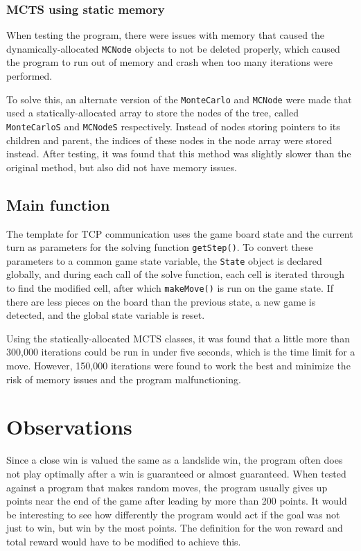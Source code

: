 \documentclass[12pt, a4paper]{article}
\begin{document}
    \subsubsection{MCTS using static memory}

    When testing the program, there were issues with memory that caused the dynamically-allocated {\tt MCNode} objects to not be deleted properly, which caused the program to run out of memory and crash when too many iterations were performed. 

    To solve this, an alternate version of the {\tt MonteCarlo} and {\tt MCNode} were made that used a statically-allocated array to store the nodes of the tree, called {\tt MonteCarloS} and {\tt MCNodeS} respectively. Instead of nodes storing pointers to its children and parent, the indices of these nodes in the node array were stored instead. After testing, it was found that this method was slightly slower than the original method, but also did not have memory issues.

    \subsection{Main function}

    The template for TCP communication uses the game board state and the current turn as parameters for the solving function {\tt getStep()}. To convert these parameters to a common game state variable, the {\tt State} object is declared globally, and during each call of the solve function, each cell is iterated through to find the modified cell, after which {\tt makeMove()} is run on the game state. If there are less pieces on the board than the previous state, a new game is detected, and the global state variable is reset. 

    Using the statically-allocated MCTS classes, it was found that a little more than 300,000 iterations could be run in under five seconds, which is the time limit for a move. However, 150,000 iterations were found to work the best and minimize the risk of memory issues and the program malfunctioning.
    

    \section{Observations}

    Since a close win is valued the same as a landslide win, the program often does not play optimally after a win is guaranteed or almost guaranteed. When tested against a program that makes random moves, the program usually gives up points near the end of the game after leading by more than 200 points. It would be interesting to see how differently the program would act if the goal was not just to win, but win by the most points. The definition for the won reward and total reward would have to be modified to achieve this.
\end{document}

